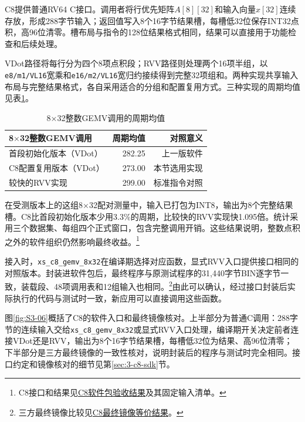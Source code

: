 C8提供普通RV64 C接口。调用者将行优先矩阵\(A[8][32]\)和输入向量\(x[32]\)连续存放，形成288字节输入；返回值写入8个16字节结果槽，每槽低32位保存INT32点积，高96位清零。槽布局与指令的128位结果格式相同，结果可以直接用于功能检查和后续处理。

VDot路径将每行分为四个8项点积段；RVV路径则处理两个16项半组，以\texttt{e8/m1/VL16}宽乘和\texttt{e16/m2/VL16}宽归约接续得到完整32项组和。两种实现共享输入布局与完整结果格式，各自采用适合的分组和配置复用方式。三种实现的周期均值见表\ref{tab:3-c8-cycles}。

\begin{table}[!htbp]\centering
\caption{8×32整数GEMV调用的周期均值}\label{tab:3-c8-cycles}
\begin{tabular}{lrr}
\toprule
8\(\times\)32整数GEMV调用 & 周期均值 & 对照意义\\
\midrule
首段初始化版本（VDot） & 282.25 & 上一版软件\\
C8配置复用版本（VDot） & 273.00 & 本节选用实现\\
较快的RVV实现 & 299.00 & 标准指令对照\\
\bottomrule
\end{tabular}
\end{table}

在受测版本上的这组8\(\times\)32配对测量中，输入已打包为INT8，输出为8个完整结果槽。C8比首段初始化版本少用3.3\%的周期，比较快的RVV实现快1.095倍。统计采用三个数据集、每组四个正式窗口，包含完整调用开销。这些结果说明，整数点积之外的软件组织仍然影响最终收益。\footnote{C8接口和结果见\href{https://github.com/cc77-builder/riscv/blob/a0f13456e0c3180fe9c4023f5cbe7874eb5d35a9/team/optimizations/o2/integration/firstdot-v2-0f/package/c8/RESULT.md}{C8软件包验收结果}及其固定输入清单。}

接入时，\texttt{xs\_c8\_gemv\_8x32}在编译期选择对应函数，显式RVV入口提供接口相同的对照版本。封装进软件包后，最终程序与原测试程序的31,440字节BIN逐字节一致，装载段、48项调用表和12组输入也相同。\footnote{三方最终镜像比较见\href{https://github.com/cc77-builder/riscv/blob/cfb0010f379f13ac7732dfb98ae600cc7ee1d44b/team/optimizations/o2/integration/firstdot-v2-0f/package/c8/relink/RESULT.md}{C8最终镜像等价结果}。}由此可以确认，经过接口封装后实际执行的代码与测试时一致，新应用可以直接调用这些函数。

图\ref{fig:S3-06}概括了C8的软件入口和最终镜像核对。上半部分为普通C调用：288字节的连续输入交给\texttt{xs\_c8\_gemv\_8x32}或显式RVV入口处理，编译期开关决定前者连接VDot还是RVV，输出为8个16字节结果槽，每槽低32位为结果、高96位清零；下半部分是三方最终镜像的一致性核对，说明封装后的程序与测试时完全相同。接口约定和镜像核对的细节见第\ref{sec:3-c8-sdk}节。


